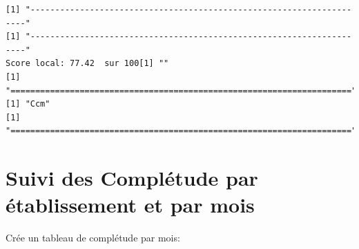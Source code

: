 \documentclass[]{article}
\begin{document}
\begin{verbatim}
[1] "---------------------------------------------------------------------"
[1] "---------------------------------------------------------------------"
Score local: 77.42  sur 100[1] ""
[1] "====================================================================="
[1] "Ccm"
[1] "====================================================================="
\end{verbatim}

\section{Suivi des Complétude par établissement et par
mois}\label{suivi-des-completude-par-etablissement-et-par-mois}

Crée un tableau de complétude par mois:
\end{document}
